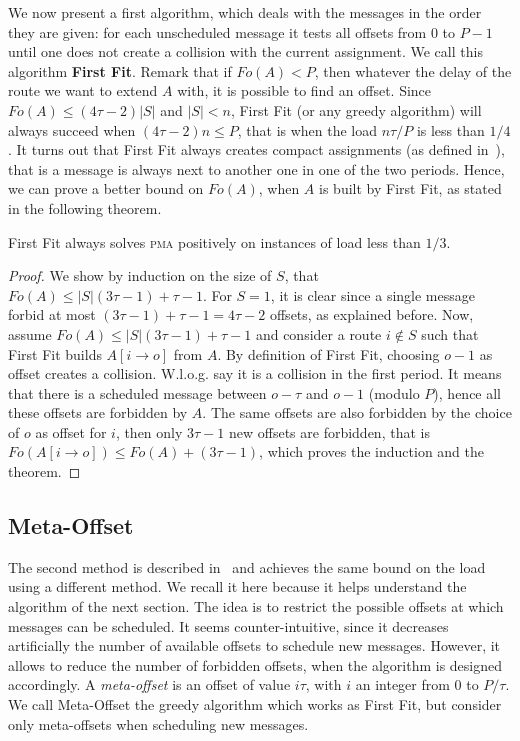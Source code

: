 \documentclass[a4paper,UKenglish,cleveref, autoref, thm-restate]{lipics-v2019}
\newcommand\pma{\textsc{pma}\xspace}
\begin{document}
We now present a first algorithm, which deals with the messages in the order they are given:  for each unscheduled message it tests all offsets from $0$ to $P-1$ until one does not create a collision with the current assignment.
We call this algorithm \textbf{First Fit}. Remark that if $Fo(A) < P$, then whatever the delay of the route we want to extend $A$ with, it is possible to find an offset. Since $Fo(A) \leq (4 \tau -2)|S|$ and $|S| < n$, First Fit (or any greedy algorithm) will always succeed when $(4 \tau -2)n \leq P$, that is when the load $ n\tau /P$ is less than $1/4$.
It turns out that First Fit always creates compact assignments (as defined in~\cite{dominique2018deterministic}), that is a message is always next to another one in one of the two periods. Hence, we can prove a better bound on $Fo(A)$, when $A$ is built by First Fit, as stated in the following theorem.

\begin{theorem}
First Fit always solves \pma positively on instances of load less than $1/3$. 
\end{theorem}
\begin{proof}
We show by induction on the size of $S$, that $Fo(A) \leq |S|(3\tau -1) + \tau -1$. For $S = 1$, it is clear since a single message forbid at most $(3\tau -1) + \tau -1 = 4\tau-2$ offsets, as explained before. Now, assume $Fo(A) \leq |S|(3\tau -1) + \tau -1$ and consider a route $i \notin S$ such that First Fit builds $A[i \rightarrow o]$ from $A$. By definition of First Fit, choosing $o-1$ as offset creates a collision. W.l.o.g. say it is a collision in the first period. It means that there is a scheduled message between $o - \tau $ and $o-1$ (modulo $P$), hence all these offsets are forbidden by $A$. The same offsets are also forbidden by the choice of $o$ as offset for $i$, then only $3\tau -1$ new offsets are forbidden, that is $Fo(A[i \rightarrow o]) \leq Fo(A) + (3\tau -1)$, which proves the induction and the theorem.
\end{proof}

\subsection{Meta-Offset}

The second method is described  in~\cite{dominique2018deterministic} and achieves the same bound on the load using a different method. We recall it here because it helps understand the algorithm of the next section.
The idea is to restrict the possible offsets at which messages can be scheduled. It seems counter-intuitive, since it decreases artificially the number of available offsets to schedule new messages. However, it allows to reduce the number of forbidden offsets, when the algorithm is designed accordingly. A \emph{meta-offset} is an offset of value $i\tau$,
with $i$ an integer from $0$ to $P / \tau$. We call Meta-Offset the greedy algorithm which works as First Fit, but consider only meta-offsets when scheduling new messages. 
\end{document}

